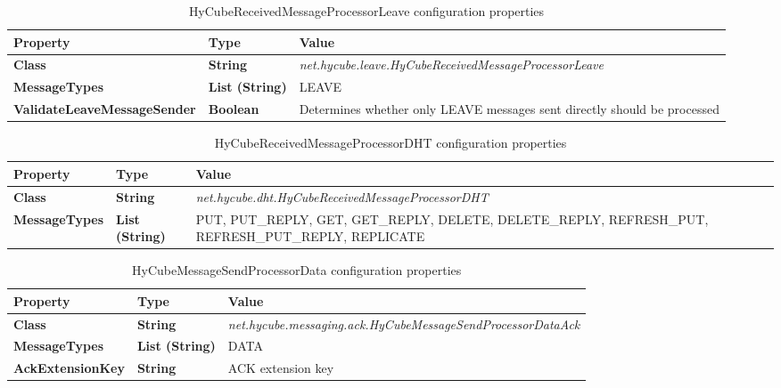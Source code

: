 \begin{table}
\scriptsize
\begin{center}
\begin{tabular}{p{4.0cm} p{1.5cm} p{9.0cm}}
	\hline
	\textbf{Property}							& \textbf{Type}					& \textbf{Value}					\\[1mm]
    \hline
	\textbf{Class}								& \textbf{String}				& \textit{net.hycube.leave.HyCubeReceivedMessageProcessorLeave}						\\[1.5mm]	
	\textbf{MessageTypes}						& \textbf{List (String)}		& LEAVE																				\\[1.5mm]	
	\textbf{ValidateLeaveMessageSender}			& \textbf{Boolean}				& Determines whether only LEAVE messages sent directly should be processed			\\[1.5mm]	
    \hline
\end{tabular}
\end{center}
\caption{HyCubeReceivedMessageProcessorLeave configuration properties}
\label{tab:libHyCubeReceivedMessageProcessorLeave}
\end{table}


\begin{table}
\scriptsize
\begin{center}
\begin{tabular}{p{4.5cm} p{1.5cm} p{8.5cm}}
	\hline
	\textbf{Property}							& \textbf{Type}					& \textbf{Value}					\\[1mm]
    \hline
	\textbf{Class}								& \textbf{String}				& \textit{net.hycube.dht.HyCubeReceivedMessageProcessorDHT}								\\[1.5mm]	
	\textbf{MessageTypes}						& \textbf{List (String)}		& PUT, PUT\_REPLY, GET, GET\_REPLY, DELETE, DELETE\_REPLY, REFRESH\_PUT, REFRESH\_PUT\_REPLY, REPLICATE				\\[1.5mm]	
    \hline
\end{tabular}
\end{center}
\caption{HyCubeReceivedMessageProcessorDHT configuration properties}
\label{tab:libHyCubeReceivedMessageProcessorDHT}
\end{table}





\begin{table}
\scriptsize
\begin{center}
\begin{tabular}{p{4.5cm} p{1.5cm} p{8.5cm}}
	\hline
	\textbf{Property}							& \textbf{Type}					& \textbf{Value}					\\[1mm]
    \hline
	\textbf{Class}								& \textbf{String}				& \textit{net.hycube.messaging.ack.HyCubeMessageSendProcessorDataAck}								\\[1.5mm]	
	\textbf{MessageTypes}						& \textbf{List (String)}		& DATA																			\\[1.5mm]	
	\textbf{AckExtensionKey}					& \textbf{String}				& ACK extension key																				\\[1.5mm]	
    \hline
\end{tabular}
\end{center}
\caption{HyCubeMessageSendProcessorData configuration properties}
\label{tab:libHyCubeMessageSendProcessorData}
\end{table}


